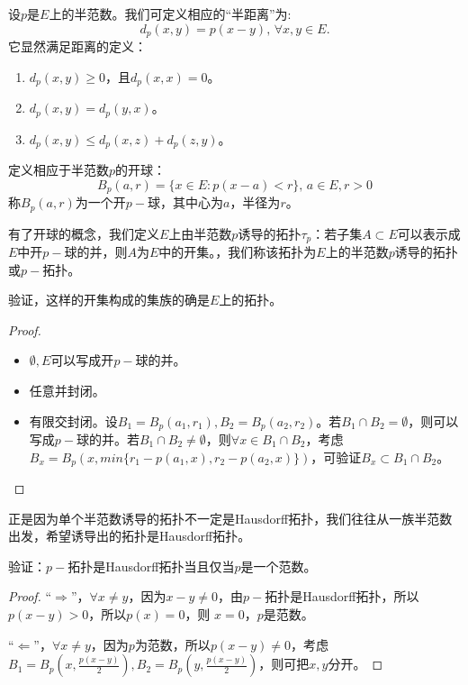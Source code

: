 设$p$是$E$上的半范数。我们可定义相应的“半距离”为:
\begin{equation*}
	d_{p}(x,y)=p(x-y), \, \forall x,y\in E.
\end{equation*}
它显然满足距离的定义：
\begin{enumerate}
	\item $d_{p}(x,y)\geq 0  $，且$d_{p}(x,x)=0 $。
	\item $d_{p}(x,y)=d_{p}(y,x)$。
	\item $d_{p}(x,y) \leq d_{p}(x,z) +d_{p}(z,y) $。
\end{enumerate}
定义相应于半范数$p$的开球：
\begin{equation*}
	B_{p}(a,r)=\{x\in E: p(x-a)<r\},\, a\in E,r>0
\end{equation*}
称$B_{p}(a,r) $为一个开$p-$球，其中心为$a$，半径为$r$。\par
有了开球的概念，我们定义$E$上由半范数$p$诱导的拓扑$\tau_{p}$：若子集$A\subset E $可以表示成$E$中开$p-$球的并，则$A$为$E$中的开集。，我们称该拓扑为$E$上的半范数$p$诱导的拓扑或$p-$拓扑。
\begin{proposition}
	验证，这样的开集构成的集族的确是$E$上的拓扑。
\end{proposition}
\begin{proof}
	\begin{itemize}
		\item $\emptyset ,E$可以写成开$p-$球的并。
		\item 任意并封闭。
		\item 有限交封闭。设$B_{1}=B_{p}(a_{1},r_{1}),B_{2}=B_{p}(a_{2},r_{2}) $。若$B_{1}\cap B_{2}=\emptyset$，则可以写成$p-$球的并。若$B_{1}\cap B_{2}\neq \emptyset$，则$\forall x\in B_{1}\cap B_{2} $，考虑$B_{x}=B_{p}(x,min\{r_{1}-p(a_{1},x),r_{2}-p(a_{2},x)\} ) $，可验证$B_{x}\subset B_{1}\cap B_{2} $。
	\end{itemize}
\end{proof}

正是因为单个半范数诱导的拓扑不一定是Hausdorff拓扑，我们往往从一族半范数出发，希望诱导出的拓扑是Hausdorff拓扑。
\begin{proposition}
	验证：$p-$拓扑是Hausdorff拓扑当且仅当$p$是一个范数。
\end{proposition}

\begin{proof}
	“$\Rightarrow$”，$\forall x\neq y$，因为$x-y\neq 0$，由$p-$拓扑是Hausdorff拓扑，所以$p(x-y)>0$，所以$p(x)=0$，则 $x=0$，$p$是范数。\par
	“$\Leftarrow$”，$\forall x\neq y $，因为$p$为范数，所以$p(x-y)\neq 0 $，考虑$B_{1}=B_{p}(x,\frac{p(x-y)}{2}),B_{2}=B_{p}(y,\frac{p(x-y)}{2})$，则可把$x,y$分开。
\end{proof}

